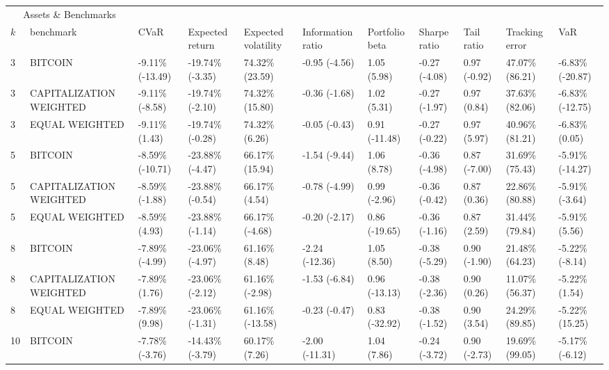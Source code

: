\documentclass{article}
\begin{document}
\begin{landscape}
\begin{table}[H]
  \centering
  \begin{tabular}{p{0.4cm}|p{3cm}|p{1.65cm}|p{1.65cm}|p{1.65cm}|p{1.65cm}|p{1.65cm}|p{1.65cm}|p{1.65cm}|p{1.65cm}|p{1.65cm}}%
    \toprule
    \multicolumn{2}{c}{Assets \& Benchmarks}                   \\
    \cmidrule(r){1-2}
    $k$ & benchmark & CVaR & Expected return & Expected volatility&Information ratio&Portfolio beta&Sharpe ratio&Tail ratio&Tracking error&VaR\\
    \midrule
    3&BITCOIN&-9.11\% (-13.49)&-19.74\% (-3.35)&74.32\% (23.59)&-0.95 (-4.56)&1.05 (5.98)&-0.27 (-4.08)&0.97 (-0.92)&47.07\% (86.21)&-6.83\% (-20.87)
\\ 
3&CAPITALIZATION WEIGHTED&-9.11\% (-8.58)&-19.74\% (-2.10)&74.32\% (15.80)&-0.36 (-1.68)&1.02 (5.31)&-0.27 (-1.97)&0.97 (0.84)&37.63\% (82.06)&-6.83\% (-12.75)
\\ 
3&EQUAL WEIGHTED&-9.11\% (1.43)&-19.74\% (-0.28)&74.32\% (6.26)&-0.05 (-0.43)&0.91 (-11.48)&-0.27 (-0.22)&0.97 (5.97)&40.96\% (81.21)&-6.83\% (0.05)
\\ 
5&BITCOIN&-8.59\% (-10.71)&-23.88\% (-4.47)&66.17\% (15.94)&-1.54 (-9.44)&1.06 (8.78)&-0.36 (-4.98)&0.87 (-7.00)&31.69\% (75.43)&-5.91\% (-14.27)
\\ 
5&CAPITALIZATION WEIGHTED&-8.59\% (-1.88)&-23.88\% (-0.54)&66.17\% (4.54)&-0.78 (-4.99)&0.99 (-2.96)&-0.36 (-0.42)&0.87 (0.36)&22.86\% (80.88)&-5.91\% (-3.64)
\\ 
5&EQUAL WEIGHTED&-8.59\% (4.93)&-23.88\% (-1.14)&66.17\% (-4.68)&-0.20 (-2.17)&0.86 (-19.65)&-0.36 (-1.16)&0.87 (2.59)&31.44\% (79.84)&-5.91\% (5.56)
\\ 
8&BITCOIN&-7.89\% (-4.99)&-23.06\% (-4.97)&61.16\% (8.48)&-2.24 (-12.36)&1.05 (8.50)&-0.38 (-5.29)&0.90 (-1.90)&21.48\% (64.23)&-5.22\% (-8.14)
\\ 
8&CAPITALIZATION WEIGHTED&-7.89\% (1.76)&-23.06\% (-2.12)&61.16\% (-2.98)&-1.53 (-6.84)&0.96 (-13.13)&-0.38 (-2.36)&0.90 (0.26)&11.07\% (56.37)&-5.22\% (1.54)
\\ 
8&EQUAL WEIGHTED&-7.89\% (9.98)&-23.06\% (-1.31)&61.16\% (-13.58)&-0.23 (-0.47)&0.83 (-32.92)&-0.38 (-1.52)&0.90 (3.54)&24.29\% (89.85)&-5.22\% (15.25)
\\ 
10&BITCOIN&-7.78\% (-3.76)&-14.43\% (-3.79)&60.17\% (7.26)&-2.00 (-11.31)&1.04 (7.86)&-0.24 (-3.72)&0.90 (-2.73)&19.69\% (99.05)&-5.17\% (-6.12)
\\ 

\end{tabular}
\end{table}
\end{landscape}
\end{document}
